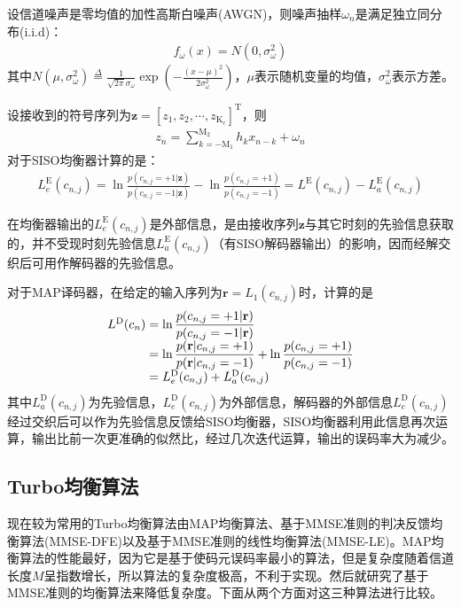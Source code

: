 设信道噪声是零均值的加性高斯白噪声(AWGN)，则噪声抽样$\omega_n$是满足独立同分布(i.i.d)：
\begin{eqnarray}
    f_{\omega}(x)=N(0,\sigma_{\omega}^2)
    \label{equ:2.32}
\end{eqnarray}
其中$N(\mu,\sigma_{\omega}^2)\overset{\Delta}{=}\frac{1}{\sqrt{2\pi}\sigma_{\omega}}\exp\left(-\frac{(x-\mu)^2}{2\sigma_{\omega}^2}\right)$，$\mu$表示随机变量的均值，$\sigma_{\omega}^2$表示方差。

设接收到的符号序列为$\mathbf{z}=[z_1,z_2,\cdots,z_{\mathrm{K}_c}]^{\mathrm{T}}$，则
\begin{eqnarray}
    z_n=\sum_{k=-\mathrm{M}_1}^{\mathrm{M}_2}h_kx_{n-k}+\omega_n
    \label{equ:2.33}
\end{eqnarray}
对于SISO均衡器计算的是：
\begin{eqnarray}
    L_e^{\mathrm{E}}(c_{n,j})=\ln\frac{p(c_{n,j}=+1|\mathbf{z})}{p(c_{n,j}=-1|\mathbf{z})}-\ln\frac{p(c_{n,j}=+1)}{p(c_{n,j}=-1)}=L^{\mathrm{E}}(c_{n,j})-L_a^{\mathrm{E}}(c_{n,j})
    \label{equ:2.34}
\end{eqnarray}

在均衡器输出的$L_e^{\mathrm{E}}(c_{n,j})$是外部信息，是由接收序列$\mathbf{z}$与其它时刻的先验信息获取的，并不受现时刻先验信息$L_a^{\mathrm{E}}(c_{n,j})$（有SISO解码器输出）的影响，因而经解交织后可用作解码器的先验信息。

对于MAP译码器，在给定的输入序列为$\mathbf{r}={L_1(c_{n,j})}$时，计算的是
\begin{eqnarray}
    \begin{array}{l@{\;=\;}l}
        L^{\mathrm{D}}(c_n)&\ln\dfrac{p(c_{n,j}=+1|\mathbf{r})}{p(c_{n,j}=-1|\mathbf{r})}\\
        &\ln\dfrac{p(\mathbf{r}|c_{n,j}=+1)}{p(\mathbf{r}|c_{n,j}=-1)}+\ln\dfrac{p(c_{n,j}=+1)}{p(c_{n,j}=-1)}\\
        &L_e^{\mathrm{D}}(c_{n,j})+L_a^{\mathrm{D}}(c_{n,j})
    \end{array}
    \label{equ:2.35}
\end{eqnarray}
其中$L_a^{\mathrm{D}}(c_{n,j})$为先验信息，$L_e^{\mathrm{D}}(c_{n,j})$为外部信息，解码器的外部信息$L_e^{\mathrm{D}}(c_{n,j})$经过交织后可以作为先验信息反馈给SISO均衡器，SISO均衡器利用此信息再次运算，输出比前一次更准确的似然比，经过几次迭代运算，输出的误码率大为减少。
\subsection{Turbo均衡算法}
现在较为常用的Turbo均衡算法由MAP均衡算法、基于MMSE准则的判决反馈均衡算法(MMSE-DFE)以及基于MMSE准则的线性均衡算法(MMSE-LE)。MAP均衡算法的性能最好，因为它是基于使码元误码率最小的算法，但是复杂度随着信道长度$M$呈指数增长，所以算法的复杂度极高，不利于实现。然后就研究了基于MMSE准则的均衡算法来降低复杂度。下面从两个方面对这三种算法进行比较。

